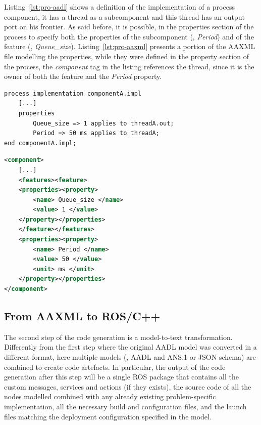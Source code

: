 Listing~\ref{lst:pro-aadl} shows a definition of the implementation of a process component, it has a thread as a subcomponent and this thread has an output port on his frontier. As said before, it is possible, in the properties section of the process to specify both the properties of the subcomponent (\ie, \textit{Period}) and of the feature (\ie, \textit{Queue\_size}). Listing~\ref{lst:pro-aaxml} presents a portion of the AAXML file modelling the properties, while they were defined in the property section of the process, the \textit{component} tag in the listing references the thread, since it is the owner of both the feature and the \textit{Period} property. 

\begin{lstlisting}[language=AADL,caption={TODO caption},label=lst:pro-aadl]
process implementation componentA.impl
	[...]
	properties
		Queue_size => 1 applies to threadA.out;
		Period => 50 ms applies to threadA;
end componentA.impl;
\end{lstlisting}

\begin{lstlisting}[language=XML,caption={TODO caption},label=lst:pro-aaxml]
<component>
	[...]
	<features><feature>
	<properties><property>
		<name> Queue_size </name>
		<value> 1 </value>
	</property></properties>
	</feature></features>
	<properties><property>
		<name> Period </name>
		<value> 50 </value>
		<unit> ms </unit>
	</property></properties>
</component>
\end{lstlisting}

\subsection{From AAXML to ROS/C++}
\label{sec:xml-cpp}
The second step of the code generation is a model-to-text transformation. Differently from the first step where the original AADL model was converted in a different format, here multiple models (\ie, AADL and ANS.1 or JSON schema) are combined to create code artefacts. In particular, the output of the code generation after this step will be a single ROS package that contains all the custom messages, services and actions (if they exists), the source code of all the nodes modelled combined with any already existing problem-specific implementation, all the necessary build and configuration files, and the launch files matching the deployment configuration specified in the model.

